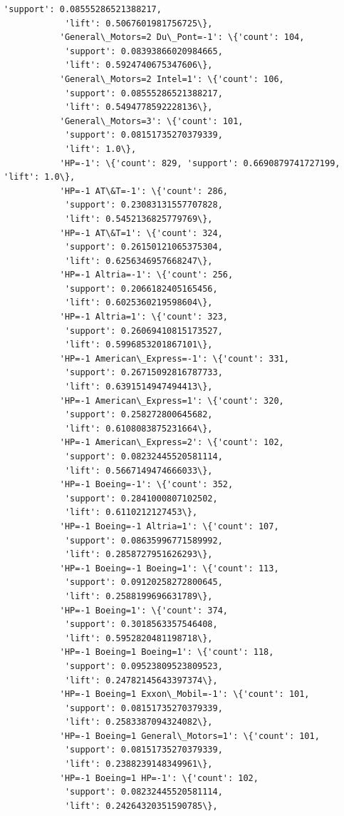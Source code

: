 \documentclass[11pt]{article}
\begin{document}
\begin{Verbatim}[commandchars=\\\{\}]
            'support': 0.08555286521388217,
            'lift': 0.5067601981756725\},
           'General\_Motors=2 Du\_Pont=-1': \{'count': 104,
            'support': 0.08393866020984665,
            'lift': 0.5924740675347606\},
           'General\_Motors=2 Intel=1': \{'count': 106,
            'support': 0.08555286521388217,
            'lift': 0.5494778592228136\},
           'General\_Motors=3': \{'count': 101,
            'support': 0.08151735270379339,
            'lift': 1.0\},
           'HP=-1': \{'count': 829, 'support': 0.6690879741727199, 'lift': 1.0\},
           'HP=-1 AT\&T=-1': \{'count': 286,
            'support': 0.23083131557707828,
            'lift': 0.5452136825779769\},
           'HP=-1 AT\&T=1': \{'count': 324,
            'support': 0.26150121065375304,
            'lift': 0.6256346957668247\},
           'HP=-1 Altria=-1': \{'count': 256,
            'support': 0.2066182405165456,
            'lift': 0.6025360219598604\},
           'HP=-1 Altria=1': \{'count': 323,
            'support': 0.26069410815173527,
            'lift': 0.5996853201867101\},
           'HP=-1 American\_Express=-1': \{'count': 331,
            'support': 0.26715092816787733,
            'lift': 0.6391514947494413\},
           'HP=-1 American\_Express=1': \{'count': 320,
            'support': 0.258272800645682,
            'lift': 0.6108083875231664\},
           'HP=-1 American\_Express=2': \{'count': 102,
            'support': 0.08232445520581114,
            'lift': 0.5667149474666033\},
           'HP=-1 Boeing=-1': \{'count': 352,
            'support': 0.2841000807102502,
            'lift': 0.6110212127453\},
           'HP=-1 Boeing=-1 Altria=1': \{'count': 107,
            'support': 0.08635996771589992,
            'lift': 0.2858727951626293\},
           'HP=-1 Boeing=-1 Boeing=1': \{'count': 113,
            'support': 0.09120258272800645,
            'lift': 0.2588199696631789\},
           'HP=-1 Boeing=1': \{'count': 374,
            'support': 0.3018563357546408,
            'lift': 0.5952820481198718\},
           'HP=-1 Boeing=1 Boeing=1': \{'count': 118,
            'support': 0.09523809523809523,
            'lift': 0.24782145643397374\},
           'HP=-1 Boeing=1 Exxon\_Mobil=-1': \{'count': 101,
            'support': 0.08151735270379339,
            'lift': 0.2583387094324082\},
           'HP=-1 Boeing=1 General\_Motors=1': \{'count': 101,
            'support': 0.08151735270379339,
            'lift': 0.2388239148349961\},
           'HP=-1 Boeing=1 HP=-1': \{'count': 102,
            'support': 0.08232445520581114,
            'lift': 0.24264320351590785\},

\end{Verbatim}
\end{document}
